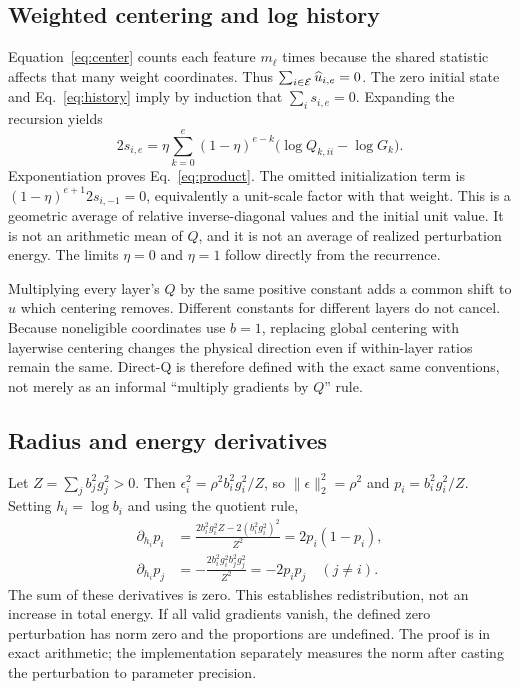 \subsection{Weighted centering and log history}
Equation~\eqref{eq:center} counts each feature $m_\ell$ times because the shared statistic affects that many weight coordinates. Thus $\sum_{i\in\mathcal{E}}\widehat u_{i,e}=0$. The zero initial state and Eq.~\eqref{eq:history} imply by induction that $\sum_i s_{i,e}=0$. Expanding the recursion yields
\begin{equation}
 2s_{i,e}=\eta\sum_{k=0}^{e}(1-\eta)^{e-k}
 \big(\log Q_{k,ii}-\log G_k\big).
\end{equation}
Exponentiation proves Eq.~\eqref{eq:product}. The omitted initialization term is $(1-\eta)^{e+1}2s_{i,-1}=0$, equivalently a unit-scale factor with that weight. This is a geometric average of relative inverse-diagonal values and the initial unit value. It is not an arithmetic mean of $Q$, and it is not an average of realized perturbation energy. The limits $\eta=0$ and $\eta=1$ follow directly from the recurrence.

Multiplying every layer's $Q$ by the same positive constant adds a common shift to $u$ which centering removes. Different constants for different layers do not cancel. Because noneligible coordinates use $b=1$, replacing global centering with layerwise centering changes the physical direction even if within-layer ratios remain the same. Direct-Q is therefore defined with the exact same conventions, not merely as an informal ``multiply gradients by $Q$'' rule.

\subsection{Radius and energy derivatives}
Let $Z=\sum_jb_j^2g_j^2>0$. Then $\epsilon_i^2=\rho^2b_i^2g_i^2/Z$, so $\|\epsilon\|_2^2=\rho^2$ and $p_i=b_i^2g_i^2/Z$. Setting $h_i=\log b_i$ and using the quotient rule,
\begin{align}
 \partial_{h_i}p_i
 &=\frac{2b_i^2g_i^2Z-2(b_i^2g_i^2)^2}{Z^2}
 =2p_i(1-p_i),\\
 \partial_{h_i}p_j
 &=-\frac{2b_i^2g_i^2b_j^2g_j^2}{Z^2}
 =-2p_ip_j\quad(j\ne i).
\end{align}
The sum of these derivatives is zero. This establishes redistribution, not an increase in total energy. If all valid gradients vanish, the defined zero perturbation has norm zero and the proportions are undefined. The proof is in exact arithmetic; the implementation separately measures the norm after casting the perturbation to parameter precision.

